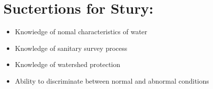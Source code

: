 \documentclass[10pt]{article}
\begin{document}
\section{Suctertions for Stury:}
\begin{itemize}
  \item Knowiedge of nomal characteristics of water

  \item Knowledge of sanitary survey process

  \item Knowledge of watershed protection

  \item Ability to discriminate between normal and abnormal conditions

\end{itemize}
\end{document}
